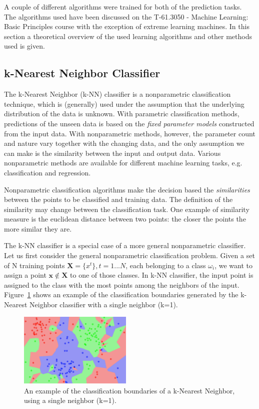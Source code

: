 A couple of different algorithms were trained for both of the prediction tasks. The algorithms used have been discussed on the T-61.3050 - Machine Learning: Basic Principles course with the exception of extreme learning machines. In this section a theoretical overview of the used learning algorithms and other methods used is given.

\subsection{k-Nearest Neighbor Classifier}
The k-Nearest Neighbor (k-NN) classifier is a nonparametric classification technique, which is (generally) used under the assumption that the underlying distribution of the data is unknown. With parametric classification methods, predictions of the unseen data is based on the \emph{fixed parameter models} constructed from the input data. With nonparametric methods, however, the parameter count and nature vary together with the changing data, and the only assumption we can make is the similarity between the input and output data. Various nonparametric methods are available for different machine learning tasks, e.g. classification and regression. \cite{alpaydin:2004:introduction} %

Nonparametric classification algorithms make the decision based the \emph{similarities} between the points to be classified and training data. The definition of the similarity may change between the classification task. One example of similarity measure is the euclidean distance between two points: the closer the points the more similar they are.

The k-NN classifier is a special case of a more general nonparametric classifier. Let us first consider the general nonparametric classification problem. Given a set of N training points  $\mathbf{X} = \{x^{t}\}, t=1...N$, each belonging to a class $\omega_{i}$, we want to assign a point $\mathbf{x} \notin \mathbf{X}$ to one of those classes. In k-NN classifier, the input point is assigned to the class with the most points among the neighbors of the input. Figure~\ref{fig:k-NN} shows an example of the classification boundaries generated by the k-Nearest Neighbor classifier with a single neighbor (k=1).

\begin{figure}[H]
\centering
\includegraphics[width=0.48\textwidth]{images/k-NN.pdf}
\caption{An example of the classification boundaries of a k-Nearest Neighbor, using a single neighbor (k=1).~\cite{wikipedia:2015:k-NN}}
\label{fig:k-NN}
\end{figure}

